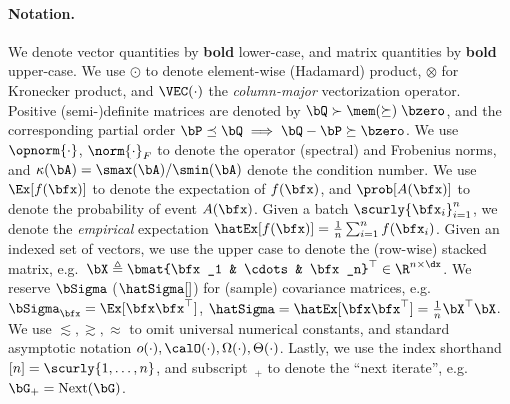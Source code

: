 \paragraph{Notation.} We denote vector quantities by \textbf{bold} lower-case, and matrix quantities by \textbf{bold} upper-case. We use $\odot$ to denote element-wise (Hadamard) product, $\otimes$ for Kronecker product, and $\VEC(\cdot)$ the \emph{column-major} vectorization operator. Positive (semi-)definite matrices are denoted by $\bQ \succ\mem(\succeq)\; \bzero$, and the corresponding partial order $\bP \preceq \bQ \implies \bQ - \bP \succeq \bzero$. We use $\opnorm{\cdot}$, $\norm{\cdot}_F$ to denote the operator (spectral) and Frobenius norms, and $\kappa(\bA) = \smax(\bA)/\smin(\bA)$ denote the condition number. We use $\Ex[f(\bfx)]$ to denote the expectation of $f(\bfx)$, and $\prob[A(\bfx)]$ to denote the probability of event $A(\bfx)$. Given a batch $\scurly{\bfx_i}_{i=1}^n$, we denote the \emph{empirical} expectation $\hatEx[f(\bfx)] = \frac{1}{n}\sum_{i=1}^n f(\bfx_i)$. Given an indexed set of vectors, we use the upper case to denote the (row-wise) stacked matrix, e.g.\ $\bX \triangleq \bmat{\bfx_1 & \cdots & \bfx_n}^\top \in \R^{n \times \dx}$. We reserve $\bSigma$ ($\hatSigma[]$) for (sample) covariance matrices, e.g.\ $\bSigma_\bfx = \Ex[\bfx \bfx^\top]$, $\hatSigma = \hatEx[\bfx \bfx^\top] = \frac{1}{n} \bX^\top \bX$. We use $\lesssim, \gtrsim, \approx$ to omit universal numerical constants, and standard asymptotic notation $o(\cdot), \calO(\cdot), \Omega(\cdot), \Theta(\cdot)$. Lastly, we use the index shorthand $[n] = \scurly{1,\dots,n}$, and subscript $\,_+$ to denote the ``next iterate'', e.g.\ $\bG_+ = \mathrm{Next}(\bG)$.
